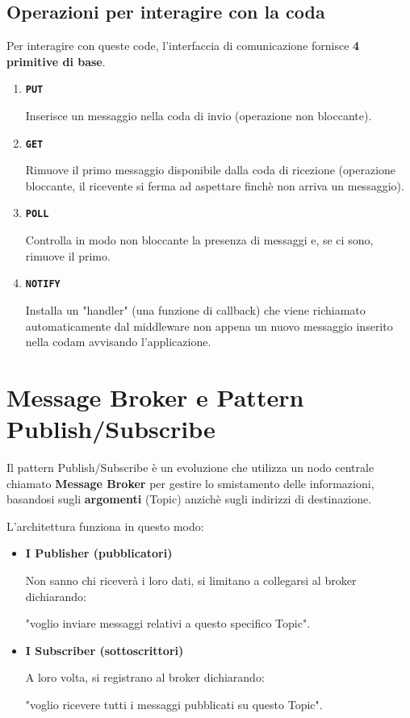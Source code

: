 \subsection{Operazioni per interagire con la coda}
Per interagire con queste code, l'interfaccia di comunicazione fornisce \textbf{4 primitive di base}.

\begin{enumerate}
    \item \textbf{\texttt{PUT}}

    Inserisce un messaggio nella coda di invio (operazione non bloccante).
    \item \textbf{\texttt{GET}}

    Rimuove il primo messaggio disponibile dalla coda di ricezione (operazione bloccante, il ricevente si ferma ad aspettare finchè non arriva un messaggio).
    \item \textbf{\texttt{POLL}}

    Controlla in modo non bloccante la presenza di messaggi e, se ci sono, rimuove il primo.
    \item \textbf{\texttt{NOTIFY}}

    Installa un "handler" (una funzione di callback) che viene richiamato automaticamente dal middleware non appena un nuovo messaggio inserito nella codam avvisando l'applicazione.
\end{enumerate}

\newpage

\section{Message Broker e Pattern Publish/Subscribe}
Il pattern Publish/Subscribe è un evoluzione che utilizza un nodo centrale chiamato \textbf{Message Broker} per gestire lo smistamento delle informazioni, basandosi sugli \textbf{argomenti} (Topic) anzichè sugli indirizzi di destinazione.

L'architettura funziona in questo modo:
\begin{itemize}
    \item \textbf{I Publisher (pubblicatori)}

    Non sanno chi riceverà i loro dati, si limitano a collegarsi al broker dichiarando:

    "voglio inviare messaggi relativi a questo specifico Topic".

    \item \textbf{I Subscriber (sottoscrittori)}

    A loro volta, si registrano al broker dichiarando:

    "voglio ricevere tutti i messaggi pubblicati su questo Topic".
\end{itemize}

